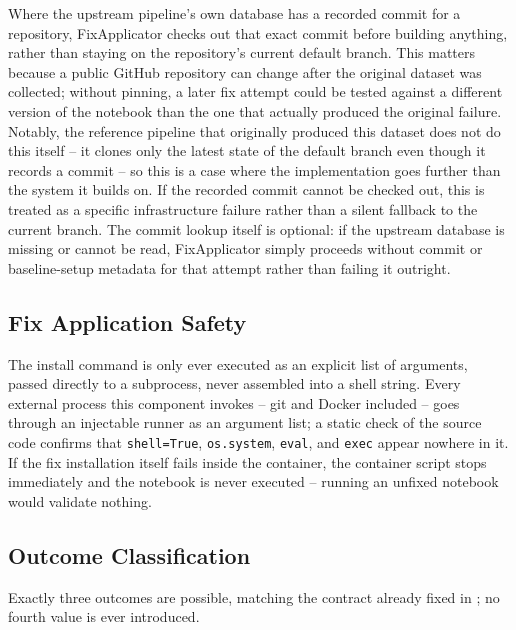 Where the upstream pipeline's own database has a recorded commit for a
repository, FixApplicator checks out that exact commit before building
anything, rather than staying on the repository's current default branch.
This matters because a public GitHub repository can change after the
original dataset was collected; without pinning, a later fix attempt could
be tested against a different version of the notebook than the one that
actually produced the original failure. Notably, the reference pipeline
that originally produced this dataset does not do this itself -- it clones
only the latest state of the default branch even though it records a
commit -- so this is a case where the implementation goes further than the
system it builds on. If the recorded commit cannot be checked out, this is
treated as a specific infrastructure failure rather than a silent fallback
to the current branch. The commit lookup itself is optional: if the
upstream database is missing or cannot be read, FixApplicator simply
proceeds without commit or baseline-setup metadata for that attempt rather
than failing it outright.

\subsection{Fix Application Safety}

The install command is only ever executed as an explicit list of arguments,
passed directly to a subprocess, never assembled into a shell string. Every
external process this component invokes -- git and Docker included -- goes
through an injectable runner as an argument list; a static check of the
source code confirms that \texttt{shell=True}, \texttt{os.system},
\texttt{eval}, and \texttt{exec} appear nowhere in it. If the fix
installation itself fails inside the container, the container script stops
immediately and the notebook is never executed -- running an unfixed
notebook would validate nothing.

\subsection{Outcome Classification}

Exactly three outcomes are possible, matching the contract already fixed in
; no fourth value is ever introduced.

